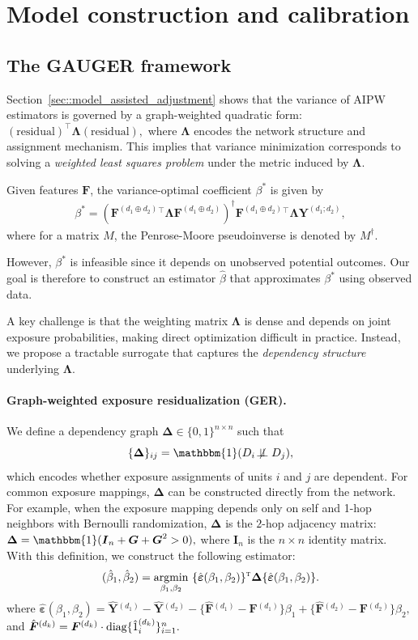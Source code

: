 \documentclass{article}
\theoremstyle{plain}
\theoremstyle{definition}
\theoremstyle{remark}
\DeclareMathOperator*{\argmin}{argmin}
\def\T{{\textsc{t}}}
\newcommand{\bY}{\boldsymbol{Y}}
\newcommand{\bG}{\boldsymbol{G}}
\newcommand{\bF}{\boldsymbol{F}}
\newcommand{\bI}{\boldsymbol{I}}
\newcommand{\bLambda}{\boldsymbol{\Lambda}}
\newcommand{\bDelta}{\boldsymbol{\Delta}}
\newcommand{\bepsilon}{\boldsymbol{\varepsilon}}
\newcommand{\indicator}{\mathbbm{1}}
\newcommand{\bFaug}{\bF^{(d_1\oplus d_2)}}
\begin{document}
\section{Model construction and calibration}
\label{sec::calibration}

\subsection{The GAUGER framework}
\label{sec::gauger}
Section~\ref{sec::model_assisted_adjustment} shows that the variance of AIPW estimators is governed by a graph-weighted quadratic form:
$(\text{residual})^\top \bLambda (\text{residual}),$
where $\bLambda$ encodes the network structure and assignment mechanism. This implies that variance minimization corresponds to solving a \emph{weighted least squares problem} under the metric induced by $\bLambda$.

Given features $\bF$, the variance-optimal coefficient $\beta^*$ is given by
\begin{align}\label{eq::beta-star}
    \beta^{*}  
    = (\bFaug{}^{\top}\bLambda\bFaug)^{\dagger}\bFaug{}^{\top}\bLambda\bY^{(d_1;d_2)},
\end{align}
where for a matrix $M$, the Penrose-Moore pseudoinverse is denoted  by $M^\dagger$.


However, $\beta^*$ is infeasible since it depends on unobserved potential outcomes. Our goal is therefore to construct an estimator $\hat{\beta}$ that approximates $\beta^*$ using observed data.

A key challenge is that the weighting matrix $\bLambda$ is dense and depends on joint exposure probabilities, making direct optimization difficult in practice. Instead, we propose a tractable surrogate that captures the \emph{dependency structure} underlying $\bLambda$.

\paragraph{Graph-weighted exposure residualization (GER).}
We define a dependency graph $\bDelta \in \{0,1\}^{n \times n}$ such that
\[
\{\bDelta\}_{ij} = \indicator(D_i \not\!\perp\!\!\!\perp D_j),
\]
which encodes whether exposure assignments of units $i$ and $j$ are dependent.  For common exposure mappings, $\bDelta$ can be constructed directly from the network. For example, when the exposure
mapping depends only on self and 1-hop neighbors with Bernoulli randomization, $\bDelta$ is the $2$-hop adjacency matrix:
$\bDelta = \indicator(\bI_n + \bG + \bG^2 > 0),$
where $\bI_n$ is the $n\times n$ identity matrix. 
With this definition, we construct the following estimator: 
\begin{align}\label{eq::regression}
    (\hat{\beta}_1, \hat{\beta}_2) 
    = \argmin_{\beta_1, \beta_2} ~
     \{\hat{\bepsilon}(\beta_1, \beta_2)\}^{\T} \bDelta \{\hat{\bepsilon}(\beta_1, \beta_2)\}.
\end{align}
where
$ \hat{\bepsilon}(\beta_1, \beta_2) = 
    \hat{\bY}{}^{(d_1)} - \hat{\bY}{}^{(d_2)} 
    - \{\hat{\bF}{}^{(d_1)} - \bF{}^{(d_1)}\} \beta_1 + \{\hat{\bF}{}^{(d_2)} - \bF{}^{(d_2)}\} \beta_2,$
and $\hat{\bF}{}^{(d_k)} = \bF{}^{(d_k)} \cdot \textup{diag}\{\hat 1{}_i^{(d_k)}\}_{i=1}^n.$ 
\end{document}

